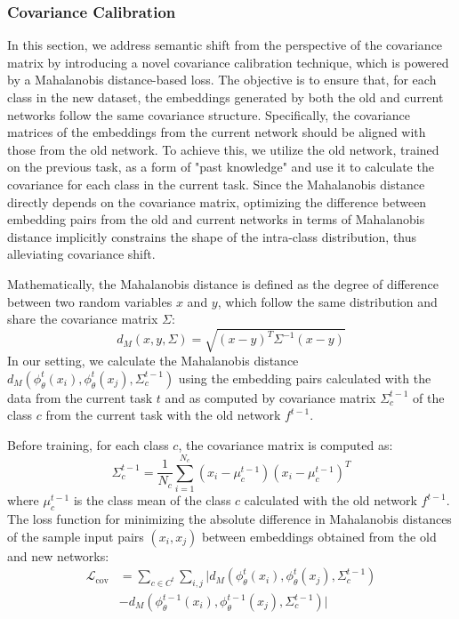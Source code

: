 \subsubsection{Covariance Calibration}
In this section, we address semantic shift from the perspective of the covariance matrix by introducing a novel covariance calibration technique, which is powered by a Mahalanobis distance-based loss. The objective is to ensure that, for each class in the new dataset, the embeddings generated by both the old and current networks follow the same covariance structure. Specifically, the covariance matrices of the embeddings from the current network should be aligned with those from the old network. To achieve this, we utilize the old network, trained on the previous task, as a form of "past knowledge" and use it to calculate the covariance for each class in the current task. Since the Mahalanobis distance directly depends on the covariance matrix, optimizing the difference between embedding pairs from the old and current networks in terms of Mahalanobis distance implicitly constrains the shape of the intra-class distribution, thus alleviating covariance shift.

Mathematically, the Mahalanobis distance \cite{mahalanobis1936generalized} is defined as the degree of difference between two random variables $x$ and $y$, which follow the same distribution and share the covariance matrix $\Sigma$:
\begin{equation}
d_M(x, y, \Sigma) = \sqrt{(x - y)^T \Sigma^{-1} (x - y)} 
\end{equation}
In our setting, we calculate the Mahalanobis distance $d_M( \phi_{\theta}^t(x_i),  \phi_{\theta}^t(x_j), \Sigma^{t-1}_c)$ using  the embedding pairs calculated with the data from the current task $t$ and as computed by covariance matrix $\Sigma^{t-1}_c$ of the class $c$ from the current task with the old network $f^{t-1}$.

Before training, for each class $c$, the covariance matrix is computed as:
\begin{equation}
    \Sigma^{t-1}_c = \frac{1}{N_c} \sum_{i=1}^{N_c} (x_i - \mu^{t-1}_c)(x_i - \mu^{t-1}_c)^T
\end{equation}
where $\mu_c^{t-1}$ is the class mean of the class $c$ calculated with the old network $f^{t-1}$. The loss function for minimizing the absolute difference in Mahalanobis distances of the sample input pairs $(x_i,x_j)$ between embeddings obtained from the old and new networks:
\begin{equation}
\begin{split}
\mathcal{L}_{\text{cov}} &= \sum_{c \in C^t} \sum_{i,j} | d_M( \phi_{\theta}^t(x_i),  \phi_{\theta}^t(x_j), \Sigma^{t-1}_c) \\
&- d_M( \phi_{\theta}^{t-1}(x_i),  \phi_{\theta}^{t-1}(x_j), \Sigma^{t-1}_c) |
\end{split}
\end{equation}

